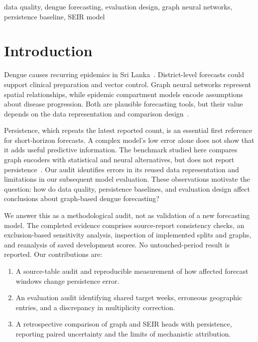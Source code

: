 \documentclass[conference]{IEEEtran}
\begin{document}
\begin{IEEEkeywords}
data quality, dengue forecasting, evaluation design, graph neural networks, persistence baseline, SEIR model
\end{IEEEkeywords}

\section{Introduction}
Dengue causes recurring epidemics in Sri Lanka~\cite{tissera2020severe}.
District-level forecasts could support clinical preparation and vector control.
Graph neural networks represent spatial relationships, while epidemic compartment models encode assumptions about disease progression.
Both are plausible forecasting tools, but their value depends on the data representation and comparison design~\cite{weng2024graph,liu2025seirlstm}.

Persistence, which repeats the latest reported count, is an essential first reference for short-horizon forecasts.
A complex model's low error alone does not show that it adds useful predictive information.
The benchmark studied here compares graph encoders with statistical and neural alternatives, but does not report persistence~\cite{weng2024graph}.
Our audit identifies errors in its reused data representation and limitations in our subsequent model evaluation.
These observations motivate the question: how do data quality, persistence baselines, and evaluation design affect conclusions about graph-based dengue forecasting?

We answer this as a methodological audit, not as validation of a new forecasting model.
The completed evidence comprises source-report consistency checks, an exclusion-based sensitivity analysis, inspection of implemented splits and graphs, and reanalysis of saved development scores.
No untouched-period result is reported.
Our contributions are:
\begin{enumerate}
\item A source-table audit and reproducible measurement of how affected forecast windows change persistence error.
\item An evaluation audit identifying shared target weeks, erroneous geographic entries, and a discrepancy in multiplicity correction.
\item A retrospective comparison of graph and SEIR heads with persistence, reporting paired uncertainty and the limits of mechanistic attribution.
\end{enumerate}
\end{document}
